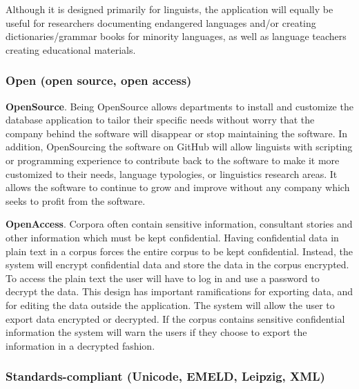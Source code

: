 \documentclass[letterpaper, 12pt, dvips]{mitwpl}
\begin{document}
Although it is designed primarily for linguists, the application will equally be useful for researchers documenting endangered languages and/or creating dictionaries/grammar books for minority languages, as well as language teachers creating educational materials.  


\subsubsection{Open (open source, open access)}


\begin{description}

\item { \bf OpenSource}. Being OpenSource allows departments to install and customize the database application to tailor their specific needs without worry that the company behind the software will disappear or stop maintaining the software. In addition, OpenSourcing the software on GitHub will allow linguists with scripting or programming experience to contribute back to the software to make it more customized to their needs, language typologies, or linguistics research areas. It allows the software to continue to grow and improve without any company which seeks to profit from the software.
 

\item {\bf OpenAccess}. Corpora often contain sensitive information, consultant stories and other information which must be kept confidential. Having confidential data in plain text in a corpus forces the entire corpus to be kept confidential. Instead, the system will encrypt confidential data and store the data in the corpus encrypted. To access the plain text the user will have to log in and use a password to decrypt the data. This design has important ramifications for exporting data, and for editing the data outside the application. The system will allow the user to export data encrypted or decrypted. If the corpus contains sensitive confidential information the system will warn the users if they choose to export the information in a decrypted fashion.


\end{description}


\subsubsection{Standards-compliant (Unicode, EMELD, Leipzig, XML)}
\end{document}
